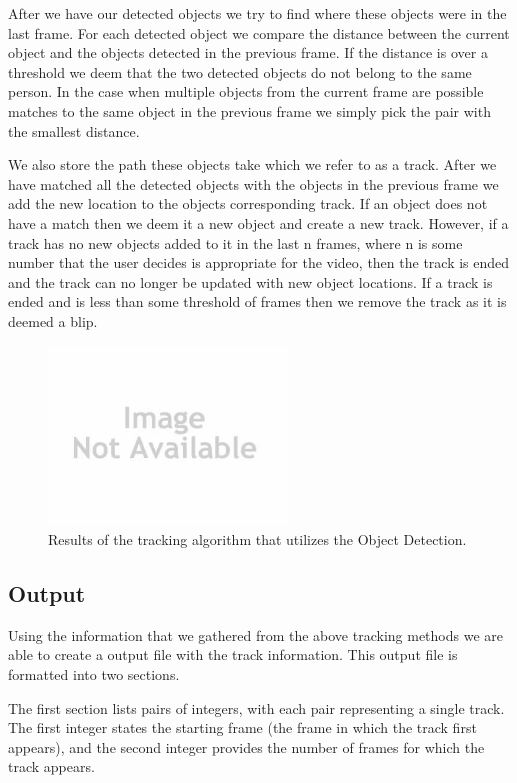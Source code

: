 \documentclass[12pt, twocolumn, conference]{IEEEtran}
\begin{document}
After we have our detected objects we try to find where these objects were in the last frame. For each detected object we compare the distance between the current object and the objects detected in the previous frame. If the distance is over a threshold we deem that the two detected objects do not belong to the same person. In the case when multiple objects from the current frame are possible matches to the same object in the previous frame we simply pick the pair with the smallest distance.

We also store the path these objects take which we refer to as a track. After we have matched all the detected objects with the objects in the previous frame we add the new location to the objects corresponding track. If an object does not have a match then we deem it a new object and create a new track. However, if a track has no new objects added to it in the last n frames, where n is some number that the user decides is appropriate for the video, then the track is ended and the track can no longer be updated with new object locations. If a track is ended and is less than some threshold of frames then we remove the track as it is deemed a blip.

\begin{figure}[!t]
\centering
\includegraphics[width=2.5in]{noImage.jpg}
\caption{Results of the tracking algorithm that utilizes the Object Detection.}
\label{Tracking_Object_Detection}
\end{figure}

\subsection{Output}

Using the information that we gathered from the above tracking methods we are able to create a output file with the track information. This output file is formatted into two sections.

The first section lists pairs of integers, with each pair representing a single track. The first integer states the starting frame (the frame in which the track first appears), and the second integer provides the number of frames for which the track appears. 
\end{document}
